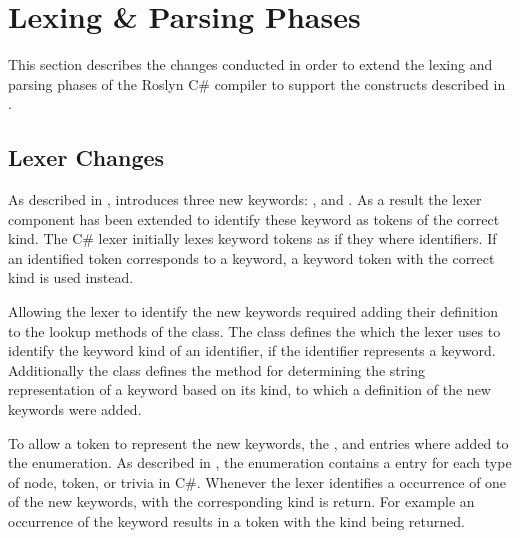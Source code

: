 \section{Lexing \& Parsing Phases}
This section describes the changes conducted in order to extend the lexing and parsing phases of the Roslyn C\# compiler to support the constructs described in .
\label{sec:roslyn_lexer_parser_changes}

\subsection{Lexer Changes}
As described in , \stmnamesp introduces three new keywords: ,  and . As a result the lexer component has been extended to identify these keyword as tokens of the correct kind. The C\# lexer initially lexes keyword tokens as if they where identifiers. If an identified token corresponds to a keyword, a keyword token with the correct kind is used instead. 

Allowing the lexer to identify the new keywords required adding their definition to the lookup methods of the  class. The  class defines the  which the lexer uses to identify the keyword kind of an identifier, if the identifier represents a keyword. Additionally the  class defines the  method for determining the string representation of a keyword based on its kind, to which a definition of the new keywords were added.

To allow a token to represent the new keywords, the ,  and  entries where added to the  enumeration. As described in , the  enumeration contains a entry for each type of node, token, or trivia in C\#. Whenever the lexer identifies a occurrence of one of the new keywords, with the corresponding kind is return. For example an occurrence of the  keyword results in a token with the kind  being returned.


